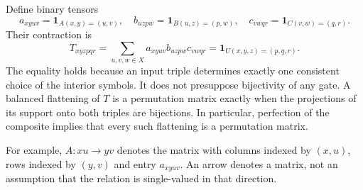 \documentclass[11pt]{article}
\newcommand{\ind}{\mathbf{1}}
\begin{document}
Define binary tensors
\[
 a_{xyuv}=\ind_{A(x,y)=(u,v)},\quad
 b_{uzpw}=\ind_{B(u,z)=(p,w)},\quad
 c_{vwqr}=\ind_{C(v,w)=(q,r)}.
\]
Their contraction is
\begin{equation}\label{contract}
 T_{xyzpqr}=\sum_{u,v,w\in X}a_{xyuv}b_{uzpw}c_{vwqr}
             =\ind_{U(x,y,z)=(p,q,r)}.
\end{equation}
The equality holds because an input triple determines exactly one
consistent choice of the interior symbols. It does not presuppose
bijectivity of any gate. A balanced flattening of $T$ is a permutation
matrix exactly when the projections of its support onto both triples
are bijections. In particular, perfection of the composite implies that
every such flattening is a permutation matrix.

For example, $A:xu\to yv$ denotes the matrix with columns indexed by
$(x,u)$, rows indexed by $(y,v)$ and entry $a_{xyuv}$.
An arrow denotes a matrix, not an assumption that the relation is
single-valued in that direction.
\end{document}
